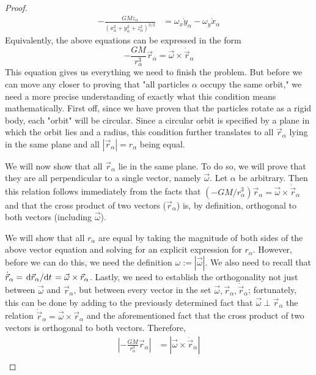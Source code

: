 \documentclass[../psets.tex]{subfiles}
\begin{document}
\begin{enumerate}
\begin{proof}
\begin{align*}
            -\frac{GMz_\alpha}{(x_\alpha^2+y_\alpha^2+z_\alpha^2)^{3/2}} &= \omega_x\dot{y}_\alpha-\omega_y\dot{x}_\alpha
        \end{align*}
        Equivalently, the above equations can be expressed in the form
        \begin{equation*}
            -\frac{GM}{r_\alpha^3}\vec{r}_\alpha = \vec{\omega}\times\dot{\vec{r}}_\alpha
        \end{equation*}
        This equation gives us everything we need to finish the problem. But before we can move any closer to proving that "all particles $\alpha$ occupy the same orbit," we need a more precise understanding of exactly what this condition means mathematically. First off, since we have proven that the particles rotate as a rigid body, each "orbit" will be circular. Since a circular orbit is specified by a plane in which the orbit lies and a radius, this condition further translates to all $\vec{r}_\alpha$ lying in the same plane and all $|\vec{r}_\alpha|=r_\alpha$ being equal.\par
        We will now show that all $\vec{r}_\alpha$ lie in the same plane. To do so, we will prove that they are all perpendicular to a single vector, namely $\vec{\omega}$. Let $\alpha$ be arbitrary. Then this relation follows immediately from the facts that $(-GM/r_\alpha^3)\vec{r}_\alpha=\vec{\omega}\times\dot{\vec{r}}_\alpha$ and that the cross product of two vectors ($\vec{r}_\alpha$) is, by definition, orthogonal to both vectors (including $\vec{\omega}$).\par
        We will show that all $r_\alpha$ are equal by taking the magnitude of both sides of the above vector equation and solving for an explicit expression for $r_\alpha$. However, before we can do this, we need the definition $\omega:=|\vec{\omega}|$. We also need to recall that $\dot{\vec{r}}_\alpha=\dv*{\vec{r}_\alpha}{t}=\vec{\omega}\times\vec{r}_\alpha$. Lastly, we need to establish the orthogonality not just between $\vec{\omega}$ and $\vec{r}_\alpha$, but between every vector in the set $\vec{\omega},\vec{r}_\alpha,\dot{\vec{r}}_\alpha$; fortunately, this can be done by adding to the previously determined fact that $\vec{\omega}\perp\vec{r}_\alpha$ the relation $\dot{\vec{r}}_\alpha=\vec{\omega}\times\vec{r}_\alpha$ and the aforementioned fact that the cross product of two vectors is orthogonal to both vectors. Therefore,
        \begingroup
        \allowdisplaybreaks
        \begin{align*}
            \left| -\frac{GM}{r_\alpha^3}\vec{r}_\alpha \right| &= \left| \vec{\omega}\times\dot{\vec{r}}_\alpha \right|\\

\end{align*}
\end{proof}
\end{enumerate}
\end{document}
